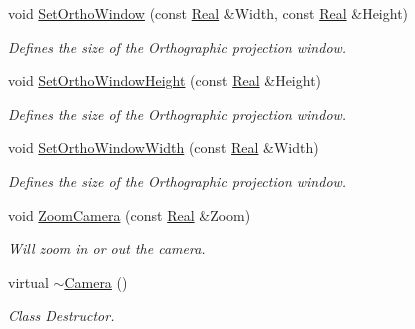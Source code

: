 \begin{DoxyCompactItemize}
void \hyperlink{classMezzanine_1_1Camera_a2beffe698c8952407f94683adea2fa24}{SetOrthoWindow} (const \hyperlink{namespaceMezzanine_a726731b1a7df72bf3583e4a97282c6f6}{Real} \&Width, const \hyperlink{namespaceMezzanine_a726731b1a7df72bf3583e4a97282c6f6}{Real} \&Height)
\begin{DoxyCompactList}\small\item\em Defines the size of the Orthographic projection window. \item\end{DoxyCompactList}\item 
void \hyperlink{classMezzanine_1_1Camera_a7e99427ba89306e3c7e6a0d5ccb23482}{SetOrthoWindowHeight} (const \hyperlink{namespaceMezzanine_a726731b1a7df72bf3583e4a97282c6f6}{Real} \&Height)
\begin{DoxyCompactList}\small\item\em Defines the size of the Orthographic projection window. \item\end{DoxyCompactList}\item 
void \hyperlink{classMezzanine_1_1Camera_a58279b526f2a386bfa0327a9084d24e4}{SetOrthoWindowWidth} (const \hyperlink{namespaceMezzanine_a726731b1a7df72bf3583e4a97282c6f6}{Real} \&Width)
\begin{DoxyCompactList}\small\item\em Defines the size of the Orthographic projection window. \item\end{DoxyCompactList}\item 
void \hyperlink{classMezzanine_1_1Camera_a10042b496caf5783657e138c62849b2f}{ZoomCamera} (const \hyperlink{namespaceMezzanine_a726731b1a7df72bf3583e4a97282c6f6}{Real} \&Zoom)
\begin{DoxyCompactList}\small\item\em Will zoom in or out the camera. \item\end{DoxyCompactList}\item 
virtual \hyperlink{classMezzanine_1_1Camera_ab25144933c625492a059e57401387c40}{$\sim$Camera} ()
\begin{DoxyCompactList}\small\item\em Class Destructor. \item\end{DoxyCompactList}\end{DoxyCompactItemize}
